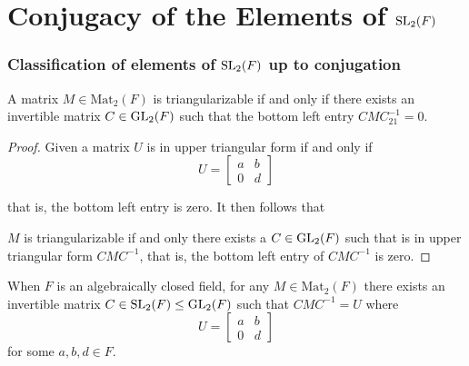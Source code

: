 \section{Conjugacy of the Elements of $\operatorname{SL}_2(F)$}

\subsubsection{Classification of elements of $\operatorname{SL}_2(F)$ up to conjugation}

\begin{lemma}
\label{isConj_upper_triangular_iff}
\leanok
    A matrix $M \in \textrm{Mat}_2(F)$ is triangularizable if and only if there exists an invertible matrix $C \in \operatorname{GL}_2(F)$ such that the bottom left entry
    $C M C^{-1}_{21} = 0$.
\end{lemma}

\begin{proof}
    Given a matrix $U$ is in upper triangular form if and only if
    \[
    U = \begin{bmatrix}
    a & b\\
    0 & d
    \end{bmatrix}
    \]
    
    that is, the bottom left entry is zero. It then follows that 

    $M$ is triangularizable if and only there exists a $C \in \operatorname{GL}_2(F)$ such that is in upper triangular form $C M C^{-1}$, that is, the bottom left entry of $C M C^{-1}$ is zero. 
\end{proof}

\begin{lemma}
\label{isTriangularizable_of_algClosed}
\leanok
    When $F$ is an algebraically closed field, 
    for any $M \in \textrm{Mat}_2(F)$ there exists an invertible matrix $C \in \operatorname{SL}_2(F) \le \operatorname{GL}_2(F)$ such that $C M C^{-1} = U$ where
    \[
    U = \begin{bmatrix}
        a & b\\
        0 & d
    \end{bmatrix}\] for some $a, b, d \in F$.

\end{lemma}

